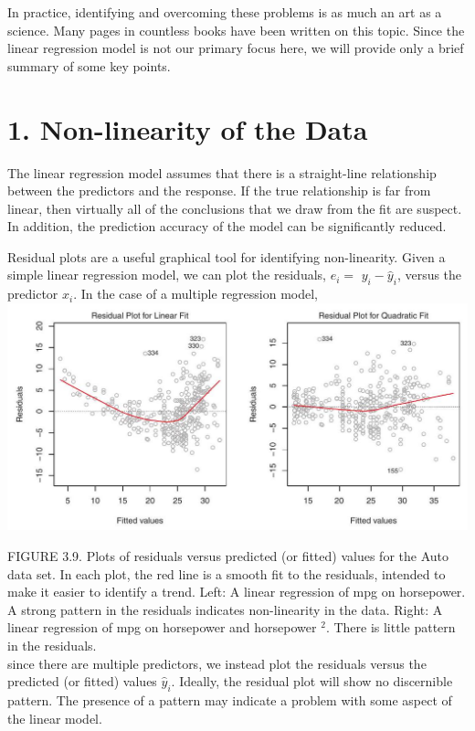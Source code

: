 \documentclass[10pt]{article}
\begin{document}
In practice, identifying and overcoming these problems is as much an art as a science. Many pages in countless books have been written on this topic. Since the linear regression model is not our primary focus here, we will provide only a brief summary of some key points.

\section*{1. Non-linearity of the Data}
The linear regression model assumes that there is a straight-line relationship between the predictors and the response. If the true relationship is far from linear, then virtually all of the conclusions that we draw from the fit are suspect. In addition, the prediction accuracy of the model can be significantly reduced.

Residual plots are a useful graphical tool for identifying non-linearity. Given a simple linear regression model, we can plot the residuals, $e_{i}=$ $y_{i}-\hat{y}_{i}$, versus the predictor $x_{i}$. In the case of a multiple regression model,\\
\includegraphics[max width=\textwidth, center]{2025_05_05_efe77898333945044de4g-108}

FIGURE 3.9. Plots of residuals versus predicted (or fitted) values for the Auto data set. In each plot, the red line is a smooth fit to the residuals, intended to make it easier to identify a trend. Left: A linear regression of mpg on horsepower. A strong pattern in the residuals indicates non-linearity in the data. Right: A linear regression of mpg on horsepower and horsepower ${ }^{2}$. There is little pattern in the residuals.\\
since there are multiple predictors, we instead plot the residuals versus the predicted (or fitted) values $\hat{y}_{i}$. Ideally, the residual plot will show no discernible pattern. The presence of a pattern may indicate a problem with some aspect of the linear model.
\end{document}
